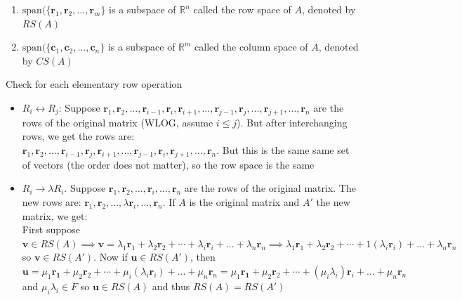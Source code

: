 \documentclass{report}
\begin{document}
{    \begin{enumerate}
        \item  $\text{span}(\{\mathbf{r}_1, \mathbf{r}_2, \ldots, \mathbf{r}_m \}$ is a subspace of $\mathbb{R}^n$ called the row space of $A$, denoted by  $RS(A)$

        \item  $\text{span}(\{\mathbf{c}_1, \mathbf{c}_2, \ldots, \mathbf{c}_n \}$ is a subspace of  $\mathbb{R}^m$ called the column space of $A$, denoted by  $CS(A)$


    \end{enumerate}
}


\begin{myproof}
    Check for each elementary row operation
    \begin{itemize}
        \item $R_i \leftrightarrow R_j$: Suppose $\mathbf{r}_1, \mathbf{r}_2, \ldots, \mathbf{r}_{i-1}, \mathbf{r}_i, \mathbf{r}_{i+1}, \ldots, \mathbf{r}_{j-1}, \mathbf{r}_j, \ldots, \mathbf{r}_{j+1}, \ldots, \mathbf{r}_n$ are the rows of the original matrix (WLOG, assume $i \le j$).  But after interchanging rows, we get the rows are: \\
            $\mathbf{r}_1, \mathbf{r}_2, \ldots, \mathbf{r}_{i-1}, \mathbf{r}_j, \mathbf{r}_{i+1}, \ldots, \mathbf{r}_{j-1}, \mathbf{r}_i, \mathbf{r}_{j+1}, \ldots, \mathbf{r}_n$. But this is the same same set of vectors (the order does not matter), so the row space is the same
    
        \item $R_i \rightarrow \lambda R_i$.  Suppose $\mathbf{r}_1, \mathbf{r}_2, \ldots, \mathbf{r}_i, \ldots, \mathbf{r}_{n}$ are the rows of the original matrix. The new rows are: $\mathbf{r}_1, \mathbf{r}_2, \ldots, \lambda \mathbf{r}_i, \ldots, \mathbf{r}_{n}$. If $A$ is the original matrix and  $A'$ the new matrix, we get: \\
            First suppose $\mathbf{v} \in RS(A) \implies \mathbf{v} = \lambda_1 \mathbf{r}_1 + \lambda _2 \mathbf{r}_2 + \cdots + \lambda _{i} \mathbf{r}_i + \ldots + \lambda_{n}\mathbf{r}_{n} \implies \lambda_1 \mathbf{r}_1 + \lambda _2 \mathbf{r}_2 + \cdots + 1(\lambda _{i} \mathbf{r}_i) + \ldots + \lambda_{n}\mathbf{r}_{n}$ so $\mathbf{v} \in RS\left( A'  \right) $. Now if $\mathbf{u} \in RS(A')$, then $\mathbf{u} = \mu_1 \mathbf{r_1} +  \mu_2 \mathbf{r}_2 +  \cdots + \mu_i ( \lambda_i \mathbf{r}_i) + \ldots +  \mu_{n} \mathbf{r}_n = \mu_1 \mathbf{r_1} +  \mu_2 \mathbf{r}_2 +  \cdots + (\mu_i  \lambda_i) \mathbf{r}_i + \ldots +  \mu_{n} \mathbf{r}_n $ and $ \mu _i \lambda _i \in F$ so $\mathbf{u} \in RS(A)$ and thus $RS(A) = RS(A')$


\end{itemize}
\end{myproof}
\end{document}
